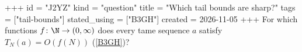 +++
id = "J2YZ"
kind = "question"
title = "Which tail bounds are sharp?"
tags = ["tail-bounds"]
stated_using = ["B3GH"]
created = 2026-11-05
+++
For which functions $f \colon \N \to (0, \infty)$ does every tame sequence $a$ satisfy $T_N(a) = O(f(N))$ (\ref{B3GH})?
